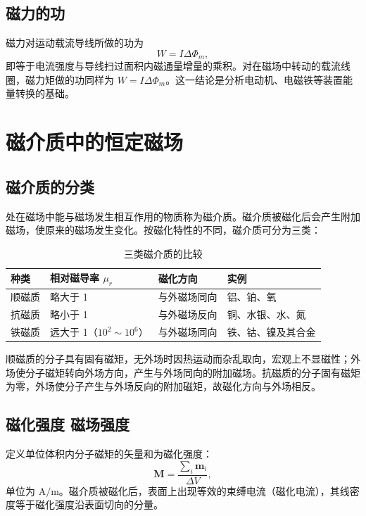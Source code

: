     \subsection{磁力的功}
    磁力对运动载流导线所做的功为
    \[
    W=I\Delta\Phi_m,
    \]
    即等于电流强度与导线扫过面积内磁通量增量的乘积。对在磁场中转动的载流线圈，磁力矩做的功同样为 $W=I\Delta\Phi_m$。这一结论是分析电动机、电磁铁等装置能量转换的基础。


\section{磁介质中的恒定磁场}
    \subsection{磁介质的分类}
    处在磁场中能与磁场发生相互作用的物质称为磁介质。磁介质被磁化后会产生附加磁场，使原来的磁场发生变化。按磁化特性的不同，磁介质可分为三类：
    \begin{table}[htbp]
    \centering
    \caption{三类磁介质的比较}
    \begin{tabular}{llll}
    \toprule
    种类 & 相对磁导率 $\mu_r$ & 磁化方向 & 实例 \\
    \midrule
    顺磁质 & 略大于 1 & 与外磁场同向 & 铝、铂、氧 \\
    抗磁质 & 略小于 1 & 与外磁场反向 & 铜、水银、水、氮 \\
    铁磁质 & 远大于 1（$10^{2}\sim10^{6}$） & 与外磁场同向 & 铁、钴、镍及其合金 \\
    \bottomrule
    \end{tabular}
    \end{table}

    顺磁质的分子具有固有磁矩，无外场时因热运动而杂乱取向，宏观上不显磁性；外场使分子磁矩转向外场方向，产生与外场同向的附加磁场。抗磁质的分子固有磁矩为零，外场使分子产生与外场反向的附加磁矩，故磁化方向与外场相反。

    \subsection{磁化强度 磁场强度}
    定义单位体积内分子磁矩的矢量和为磁化强度：
    \[
    \boldsymbol{M}=\frac{\sum_i\boldsymbol{m}_i}{\Delta V},
    \]
    单位为 $\mathrm{A/m}$。磁介质被磁化后，表面上出现等效的束缚电流（磁化电流），其线密度等于磁化强度沿表面切向的分量。

